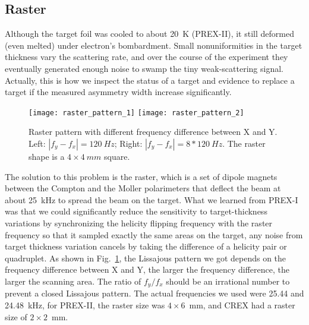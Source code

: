 \subsection{Raster}
Although the target foil was cooled to about 20~K (PREX-II), it still deformed (even melted)
under electron's bombardment. Small nonuniformities in the target 
thickness vary the scattering rate, and over the course of the experiment they 
eventually generated enough noise to swamp the tiny weak-scattering signal.
Actually, this is how we inspect the status of a target and evidence to
replace a target if the measured asymmetry width increase significantly.

\begin{figure}
    \centering
    \texttt{[image: raster\_pattern\_1]}
    \texttt{[image: raster\_pattern\_2]}
    \caption{Raster pattern with different frequency difference between X and Y.
    Left: $|f_y - f_x| = 120\ Hz$; Right: $|f_y - f_x| = 8*120\ Hz$. The raster
    shape is a $4\times 4\ mm$ square.} 
    \label{fig:raster_pattern}
\end{figure}

The solution to this problem is the raster, which is a set of dipole magnets %
between the Compton and the Moller polarimeters
that deflect the beam at about 25~kHz to spread the beam on the target.
What we learned from PREX-I was that we could significantly reduce the sensitivity 
to target-thickness variations by synchronizing the helicity flipping frequency
with the raster frequency so that it sampled exactly the same areas on the target,
any noise from target thickness variation cancels by taking the difference of
a helicity pair or quadruplet. 
As shown in Fig.~\ref{fig:raster_pattern}, the Lissajous pattern we got depends
on the frequency difference between X and Y, the larger the frequency difference,
the larger the scanning area. The ratio of $f_y/f_x$ should be an irrational number
to prevent a closed Lissajous pattern. The actual frequencies we used were 25.44
and 24.48~kHz, for PREX-II, the raster size was $4 \times 6$~mm, and CREX
had a raster size of $2 \times 2$~mm.

